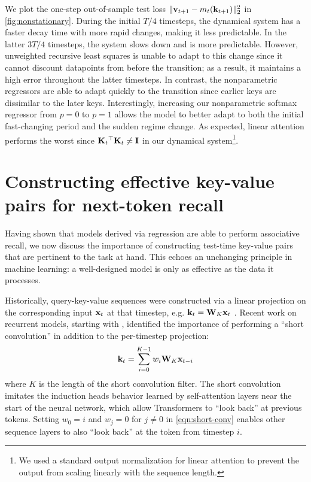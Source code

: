 \documentclass[notitlepage, 11pt]{article}
\newcommand*{\memory}{{m}}
\begin{document}
We plot the one-step out-of-sample test loss $\norm{\vbf_{t+1} - \memory_t(\kbf_{t+1})}_2^2$ in \autoref{fig:nonstationary}.
During the initial $T/4$ timesteps, the dynamical system has a faster decay time with more rapid changes, making it less predictable.
In the latter $3T/4$ timesteps, the system slows down and is more predictable.
However, unweighted recursive least squares is unable to adapt to this change since it cannot discount datapoints from before the transition; as a result, it maintains a high error throughout the latter timesteps.
In contrast, the nonparametric regressors are able to adapt quickly to the transition since earlier keys are dissimilar to the later keys.
Interestingly, increasing our nonparametric softmax regressor from $p=0$ to $p=1$ allows the model to better adapt to both the initial fast-changing period and the sudden regime change.
As expected, linear attention performs the worst since $\mathbf{K}_t{}^\top\mathbf{K}_t \neq \mathbf{I}$ in our dynamical system\footnote{We used a standard output normalization for linear attention \citep{Qin2022DevilLinearTransformer} to prevent the output from scaling linearly with the sequence length.}.

\section{Constructing effective key-value pairs for next-token recall}\label{sec:key-construction}
Having shown that models derived via regression are able to perform associative recall, we now discuss the importance of constructing test-time key-value pairs that are pertinent to the task at hand.
This echoes an unchanging principle in machine learning: a well-designed model is only as effective as the data it processes.

Historically, query-key-value sequences were constructed via a linear projection on the corresponding input $\mathbf{x}_t$ at that timestep, e.g.  $\mathbf{k}_t = \mathbf{W}_K\mathbf{x}_t$ \citep{Vaswani2017AttentionAllYou}.
Recent work on recurrent models, starting with \citet{Fu2022HungryHungryHippos}, identified the importance of performing a ``short convolution'' in addition to the per-timestep projection:
\begin{align}
    \mathbf{k}_t = \sum_{i=0}^{K-1} w_i \mathbf{W}_K \mathbf{x}_{t-i} \label{eqn:short-conv}
\end{align}
where $K$ is the length of the short convolution filter.
The short convolution imitates the induction heads behavior learned by self-attention layers near the start of the neural network,  which allow Transformers to ``look back'' at previous tokens.
Setting $w_0=i$ and $w_j=0$ for $j\neq 0$ in \autoref{eqn:short-conv} enables other sequence layers to also ``look back'' at the token from timestep $i$.
\end{document}

